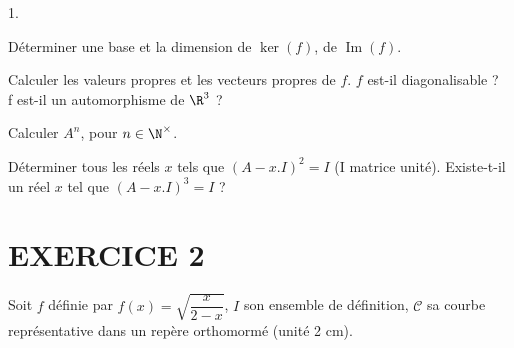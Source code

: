 \documentclass[11pt]{article}%
\begin{document}
\begin{noliste}{1.}
 \setlength{\itemsep}{4mm}
\item Déterminer une base et la dimension de $\ker (f)$, de
$\operatorname{Im}(f)$.

\item Calculer les valeurs propres et les vecteurs propres de $f$. $f$
est-il diagonalisable ? \\
f est-il un automorphisme de $\R^{3}$ ?

\item Calculer $A^{n}$, pour $n\in \N^{\times }$.

\item Déterminer tous les réels $x$ tels que $(A-x.I)^{2} = I$ (I
matrice unité). Existe-t-il un réel $x$ tel que $(A-x.I)^{3} = I$ ?
\end{noliste}

\section*{EXERCICE 2}

Soit $f$ définie par $f(x) = \sqrt{\dfrac{x}{2-x}}$, $I$ son ensemble
de définition, $\mathcal{C}$ sa courbe représentative dans un repère
orthomormé
(unité 2 cm).
\end{document}
